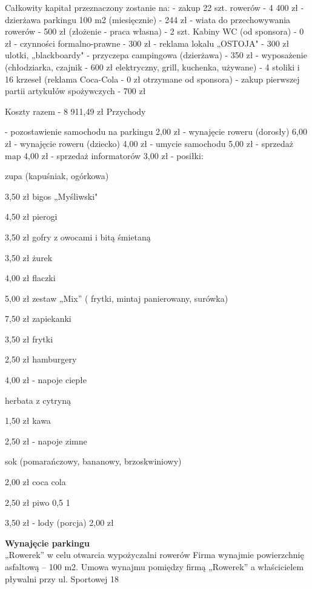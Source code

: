\documentclass{sprawozdanie-agh}
\begin{document}
		Całkowity kapitał przeznaczony zostanie na:
		- zakup 22 szt. rowerów	-  						4 400  zł
		- dzierżawa parkingu 100 m2  (miesięcznie)  	-  			    244 zł
		- wiata do przechowywania rowerów	-				    500 zł
		(złożenie - praca własna)
		- 2 szt. Kabiny WC (od sponsora)	-        			                              0 zł
		- czynności formalno-prawne	-     					    300 zł
		- reklama lokalu „OSTOJA"	-     					    300 zł
		ulotki, „blackboardy"
		- przyczepa campingowa (dzierżawa)	-     				    350 zł
		- wyposażenie (chłodziarka, czajnik	-     				    600 zł
		elektryczny, grill, kuchenka, używane)
		- 4 stoliki i 16 krzeseł (reklama Coca-Cola	-         			        0 zł
		otrzymane od sponsora)
		- zakup pierwszej partii artykułów  spożywczych 	-     		    700 zł
		
		Koszty razem
		- 8 911,49  zł
		Przychody
		
		- pozostawienie samochodu na parkingu
		2,00 zł
		- wynajęcie roweru (dorosły)
		6,00 zł
		- wynajęcie roweru (dziecko)
		4,00 zł
		- umycie samochodu
		5,00 zł
		- sprzedaż map
		4,00 zł
		- sprzedaż informatorów
		3,00 zł
		- posiłki:
		
		zupa (kapuśniak, ogórkowa)
		
		3,50 zł
		bigos „Myśliwski"
		
		4,50 zł
		pierogi
		
		3,50 zł
		gofry z owocami i bitą śmietaną
		
		3,50 zł
		żurek
		
		4,00 zł
		flaczki
		
		5,00 zł
		zestaw „Mix”  ( frytki, mintaj panierowany, surówka)
		
		7,50 zł
		zapiekanki
		
		3,50 zł
		frytki
		
		2,50 zł
		hamburgery
		
		4,00 zł
		- napoje ciepłe
		
		herbata z cytryną
		
		1,50 zł
		kawa
		
		2,50 zł
		- napoje zimne
		
		sok (pomarańczowy, bananowy, brzoskwiniowy)
		
		2,00 zł
		coca cola
		
		2,50 zł
		piwo 0,5 1
		
		3,50 zł
		- lody (porcja)
		2,00 zł
		
		\textbf{Wynajęcie parkingu}\\
		„Rowerek” w celu otwarcia wypożyczalni rowerów Firma wynajmie powierzchnię asfaltową – 100 m2. Umowa wynajmu pomiędzy firmą „Rowerek” a właścicielem pływalni przy ul. Sportowej 18
		
\end{document}
